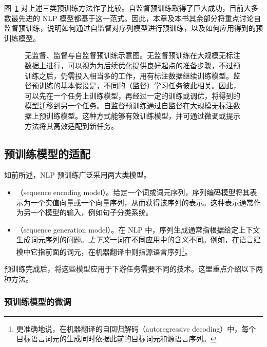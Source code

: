 图~\ref{fig:unsupervised-supervised-self-supervised-pre-training} 对上述三类预训练方法作了比较。自监督预训练取得了巨大成功，目前大多数最先进的 NLP 模型都基于这一范式。因此，本章及本书其余部分将重点讨论自监督预训练，说明如何通过自监督对序列模型进行预训练，以及如何应用得到的预训练模型。

\begin{figure}[!t]
\centering

\caption{无监督、监督与自监督预训练示意图。无监督预训练在大规模无标注数据上进行，可以视为为后续优化提供良好起点的准备步骤，不过预训练之后，仍需投入相当多的工作，用有标注数据继续训练模型。监督预训练的基本假设是，不同的（监督）学习任务彼此相关。因此，可以先在一个任务上训练模型，再经过一定的训练或调优，将得到的模型迁移到另一个任务。自监督预训练通过自监督在大规模无标注数据上预训练模型。这种方式能够有效训练模型，并可通过微调或提示方法将其高效适配到新任务。}
\label{fig:unsupervised-supervised-self-supervised-pre-training}
\end{figure}

\subsection{预训练模型的适配}

\noindent 如前所述，NLP 预训练广泛采用两大类模型。

\begin{itemize}
\item \vspace{0.5em} （sequence encoding model）。给定一个词或词元序列，序列编码模型将其表示为一个实值向量或一个向量序列，从而获得该序列的表示。这种表示通常作为另一个模型的输入，例如句子分类系统。
\item \vspace{0.3em} （sequence generation model）。在 NLP 中，序列生成通常指根据给定上下文生成词元序列的问题。\textit{上下文}一词在不同应用中的含义不同。例如，在语言建模中它指前面的词元，在机器翻译中则指源语言序列\footnote{更准确地说，在机器翻译的自回归解码（autoregressive decoding）中，每个目标语言词元的生成同时依据此前的目标词元和源语言序列。}。
\end{itemize}
\vspace{0.5em}

预训练完成后，将这些模型应用于下游任务需要不同的技术。这里重点介绍以下两种方法。

\subsubsection{预训练模型的微调}
\label{sec:fine-tuning-encoders}

